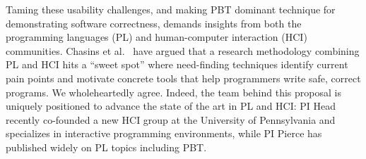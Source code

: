 
Taming these usability challenges, and making PBT dominant technique for
demonstrating software correctness, demands insights from both the
programming languages (PL) and
human-computer interaction (HCI) communities.  Chasins et
al.~\cite{chasins_pl_2021} have argued that a research methodology
combining PL and HCI hits a ``sweet spot'' where need-finding techniques identify
current pain points and motivate concrete tools that help programmers write
safe, correct programs. We wholeheartedly agree.
Indeed, the team behind this proposal is uniquely positioned to advance the
state of the art in PL and HCI: PI Head recently co-founded
a new HCI group at the University of Pennsylvania and specializes in interactive
programming environments, while PI Pierce has
published widely on PL topics including PBT.

\iflater
{}
\fi


